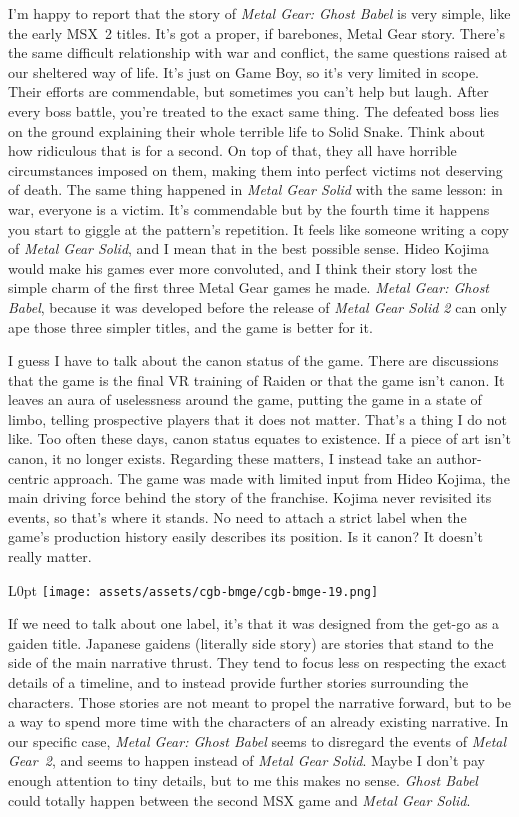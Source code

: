 \documentclass{book}
\begin{document}
I’m happy to report that the story of \emph{Metal Gear: Ghost Babel} is very simple, like the early MSX~2 titles. It’s got a proper, if barebones, Metal Gear story. There’s the same difficult relationship with war and conflict, the same questions raised at our sheltered way of life. It’s just on Game Boy, so it’s very limited in scope. Their efforts are commendable, but sometimes you can’t help but laugh. After every boss battle, you’re treated to the exact same thing. The defeated boss lies on the ground explaining their whole terrible life to Solid Snake. Think about how ridiculous that is for a second. On top of that, they all have horrible circumstances imposed on them, making them into perfect victims not deserving of death. The same thing happened in \emph{Metal Gear Solid} with the same lesson: in war, everyone is a victim. It’s commendable but by the fourth time it happens you start to giggle at the pattern’s repetition. It feels like someone writing a copy of \emph{Metal Gear Solid}, and I mean that in the best possible sense. Hideo Kojima would make his games ever more convoluted, and I think their story lost the simple charm of the first three Metal Gear games he made. \emph{Metal Gear: Ghost Babel}, because it was developed before the release of \emph{Metal Gear Solid 2} can only ape those three simpler titles, and the game is better for it.

I guess I have to talk about the canon status of the game. There are discussions that the game is the final VR training of Raiden or that the game isn’t canon. It leaves an aura of uselessness around the game, putting the game in a state of limbo, telling prospective players that it does not matter. That’s a thing I do not like. Too often these days, canon status equates to existence. If a piece of art isn’t canon, it no longer exists. Regarding these matters, I instead take an author-centric approach. The game was made with limited input from Hideo Kojima, the main driving force behind the story of the franchise. Kojima never revisited its events, so that’s where it stands. No need to attach a strict label when the game’s production history easily describes its position. Is it canon? It doesn’t really matter.

\begin{wrapfigure}{L}{0pt} \texttt{[image: assets/assets/cgb-bmge/cgb-bmge-19.png]}\end{wrapfigure}
If we need to talk about one label, it’s that it was designed from the get-go as a gaiden title. Japanese gaidens (literally side story) are stories that stand to the side of the main narrative thrust. They tend to focus less on respecting the exact details of a timeline, and to instead provide further stories surrounding the characters. Those stories are not meant to propel the narrative forward, but to be a way to spend more time with the characters of an already existing narrative. In our specific case, \emph{Metal Gear: Ghost Babel} seems to disregard the events of \emph{Metal Gear~2}, and seems to happen instead of \emph{Metal Gear Solid}. Maybe I don’t pay enough attention to tiny details, but to me this makes no sense. \emph{Ghost Babel} could totally happen between the second MSX game and \emph{Metal Gear Solid}.
\end{document}
